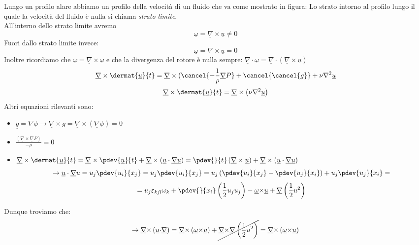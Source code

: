 Lungo un profilo alare abbiamo un profilo della velocità di un fluido che va come mostrato in figura:
Lo strato intorno al profilo lungo il quale la velocità del fluido è nulla si chiama \emph{strato limite}.\\ 
All'interno dello strato limite avremo 
\[
  \underline{\omega} = \underline{\nabla} \times \underline{u} \neq 0
\]
Fuori dallo strato limite invece:
\[
  \underline{\omega} = \underline{\nabla} \times \underline{u} = 0
\]
Inoltre ricordiamo che $  \underline{\omega} = \underline{\nabla}\times \underline{\omega} $ e che la divergenza del rotore è nulla sempre: $ \underline{\nabla}\cdot \underline{\omega}= \underline{\nabla}\cdot \left( \underline{\nabla}\times \underline{u} \right)$\[
	\underline{\nabla}\times \dermat{\underline{u}}{t} = \underline{\nabla}\times(\cancel{-\frac{1}{\rho}\underline{\nabla}P} + \cancel{\cancel{g}} + \nu \nabla ^2 \underline{u}
\]
\[
	\underline{\nabla}\times \dermat{\underline{u}}{t} = \underline{\nabla}\times \left( \nu \nabla ^2 \underline{u}
 \right)\]
 Altri equazioni rilevanti sono:
 \begin{itemize}
	 \item $ \underline{g} = \nabla \phi  \rightarrow \underline{\nabla}\times g = \underline{\nabla}\times \left(  \underline{\nabla} \phi \right) = 0$ 
	 \item $ \frac{ \left( \underline{\nabla}\times \underline{\nabla}P \right)}{-\rho} = 0 $
	 \item $ \underline{\nabla}\times \dermat{\underline{u}}{t} = \underline{\nabla}\times \pdev{\underline{u}}{t} + \underline{\nabla}\times \left( \underline{u}\cdot \underline{\nabla}\underline{u} \right) =\pdev{}{t}\left( \underline{\nabla}\times \underline{u} \right) + \underline{\nabla}\times \left(  \underline{u}\cdot \underline{\nabla}\underline{u} \right)$
		 \[
			 \rightarrow \underline{u}\cdot \underline{\nabla} u = u_j \pdev{u_i}{x_j} = u_j \pdev{u_i}{x_j} = u_j \left( \pdev{u_i}{x_j}-\pdev{u_j}{x_i} \right) + {u_j}\pdev{{u_j}}{{x_i}}=
		 \]
		 \[
			 = {u_j}\varepsilon_{kjl} {\omega}_{k} + \pdev{}{{x_i}}\left( \frac{1}{2}{u_j}{u_j} \right) - \underline{{\omega}}{\times}\underline{u}+\underline{\nabla}\left( \frac{1}{2} u ^2 \right) 
		 \]
 \end{itemize}
 Dunque troviamo che:
 \[
	 \rightarrow \underline{\nabla}{\times}\left( \underline{u}{\cdot}\underline{\nabla} \right) = \underline{\nabla}{\times}\left( \underline{{\omega}}{\times}\underline{u} \right) + \cancel{\underline{\nabla}{\times}\underline{\nabla}\left( \frac{1}{2} u ^2 \right)} = \underline{\nabla}{\times}\left( \underline{ {\omega}}{\times}\underline{u} \right)
 \]

